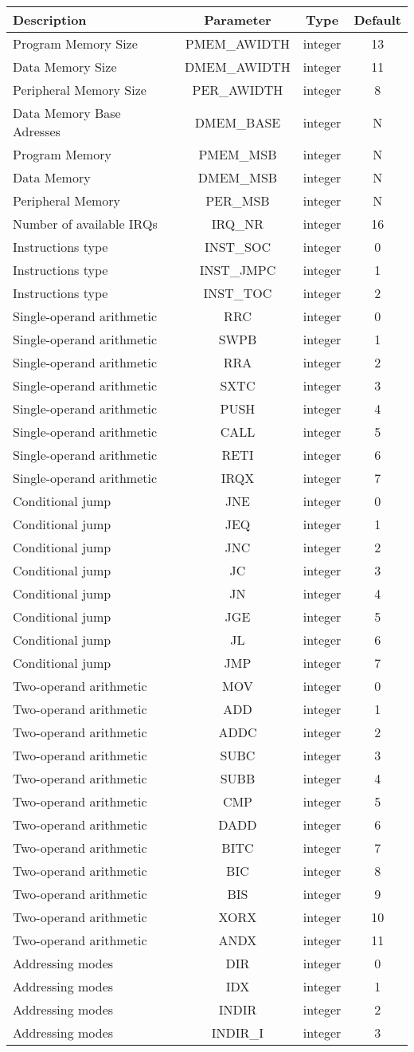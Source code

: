 \documentclass[]{article}
\begin{document}
\begin{longtable}[]{@{}lccc@{}}
\toprule
Description & Parameter & Type & Default\tabularnewline
\midrule
\endhead
Program Memory Size & PMEM\_AWIDTH & integer & 13\tabularnewline
Data Memory Size & DMEM\_AWIDTH & integer & 11\tabularnewline
Peripheral Memory Size & PER\_AWIDTH & integer & 8\tabularnewline
Data Memory Base Adresses & DMEM\_BASE & integer & N\tabularnewline
Program Memory & PMEM\_MSB & integer & N\tabularnewline
Data Memory & DMEM\_MSB & integer & N\tabularnewline
Peripheral Memory & PER\_MSB & integer & N\tabularnewline
Number of available IRQs & IRQ\_NR & integer & 16\tabularnewline
Instructions type & INST\_SOC & integer & 0\tabularnewline
Instructions type & INST\_JMPC & integer & 1\tabularnewline
Instructions type & INST\_TOC & integer & 2\tabularnewline
Single-operand arithmetic & RRC & integer & 0\tabularnewline
Single-operand arithmetic & SWPB & integer & 1\tabularnewline
Single-operand arithmetic & RRA & integer & 2\tabularnewline
Single-operand arithmetic & SXTC & integer & 3\tabularnewline
Single-operand arithmetic & PUSH & integer & 4\tabularnewline
Single-operand arithmetic & CALL & integer & 5\tabularnewline
Single-operand arithmetic & RETI & integer & 6\tabularnewline
Single-operand arithmetic & IRQX & integer & 7\tabularnewline
Conditional jump & JNE & integer & 0\tabularnewline
Conditional jump & JEQ & integer & 1\tabularnewline
Conditional jump & JNC & integer & 2\tabularnewline
Conditional jump & JC & integer & 3\tabularnewline
Conditional jump & JN & integer & 4\tabularnewline
Conditional jump & JGE & integer & 5\tabularnewline
Conditional jump & JL & integer & 6\tabularnewline
Conditional jump & JMP & integer & 7\tabularnewline
Two-operand arithmetic & MOV & integer & 0\tabularnewline
Two-operand arithmetic & ADD & integer & 1\tabularnewline
Two-operand arithmetic & ADDC & integer & 2\tabularnewline
Two-operand arithmetic & SUBC & integer & 3\tabularnewline
Two-operand arithmetic & SUBB & integer & 4\tabularnewline
Two-operand arithmetic & CMP & integer & 5\tabularnewline
Two-operand arithmetic & DADD & integer & 6\tabularnewline
Two-operand arithmetic & BITC & integer & 7\tabularnewline
Two-operand arithmetic & BIC & integer & 8\tabularnewline
Two-operand arithmetic & BIS & integer & 9\tabularnewline
Two-operand arithmetic & XORX & integer & 10\tabularnewline
Two-operand arithmetic & ANDX & integer & 11\tabularnewline
Addressing modes & DIR & integer & 0\tabularnewline
Addressing modes & IDX & integer & 1\tabularnewline
Addressing modes & INDIR & integer & 2\tabularnewline
Addressing modes & INDIR\_I & integer & 3\tabularnewline

\end{longtable}
\end{document}
